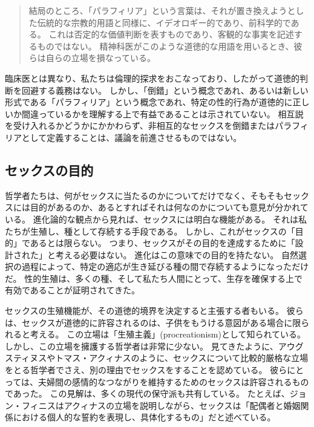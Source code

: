 \documentclass[paper=a4,book,openany]{jlreq}
\begin{document}
\begin{quote}
  結局のところ、「パラフィリア」という言葉は、それが置き換えようとした伝統的な宗教的用語と同様に、イデオロギー的であり、前科学的である。
これは否定的な価値判断を表すものであり、客観的な事実を記述するものではない。
精神科医がこのような道徳的な用語を用いるとき、彼らは自らの立場を損なっている。
\citep{haeberle16:_parap}

\end{quote}

臨床医とは異なり、私たちは倫理的探求をおこなっており、したがって道徳的判断を回避する義務はない。
しかし、「倒錯」という概念であれ、あるいは新しい形式である「パラフィリア」という概念であれ、特定の性的行為が道徳的に正しいか間違っているかを理解する上で有益であることは示されていない。
相互説を受け入れるかどうかにかかわらず、非相互的なセックスを倒錯またはパラフィリアとして定義することは、議論を前進させるものではない。

\subsection{セックスの目的}

哲学者たちは、何がセックスに当たるのかについてだけでなく、そもそもセックスには目的があるのか、あるとすればそれは何なのかについても意見が分かれている。
進化論的な観点から見れば、セックスには明白な機能がある。
それは私たちが生殖し、種として存続する手段である。
しかし、これがセックスの「目的」であるとは限らない。
つまり、セックスがその目的を達成するために「設計された」と考える必要はない。
進化はこの意味での目的を持たない。
自然選択の過程によって、特定の適応が生き延びる種の間で存続するようになっただけだ。
性的生殖は、多くの種、そして私たち人間にとって、生存を確保する上で有効であることが証明されてきた。

セックスの生殖機能が、その道徳的境界を決定すると主張する者もいる。
彼らは、セックスが道徳的に許容されるのは、子供をもうける意図がある場合に限られると考える。
この立場は「生殖主義」(procreationism)として知られている。
しかし、この立場を擁護する哲学者は非常に少ない。
見てきたように、アウグスティヌスやトマス・アクィナスのように、セックスについて比較的厳格な立場をとる哲学者でさえ、別の理由でセックスをすることを認めている。
彼らにとっては、夫婦間の感情的なつながりを維持するためのセックスは許容されるものであった。
この見解は、多くの現代の保守派も共有している。
たとえば、ジョン・フィニスはアクィナスの立場を説明しながら、セックスは「配偶者と婚姻関係における個人的な誓約を表現し、具体化するもの」だと述べている\citep[p. 392]{finnis08:_marriag}。
\end{document}
